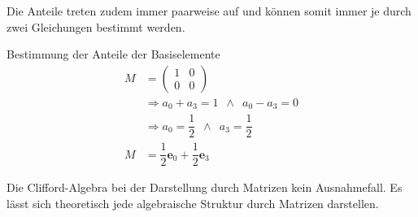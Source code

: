 Die Anteile treten zudem immer paarweise auf und können somit immer je durch zwei Gleichungen bestimmt werden.
\begin{beispiel}
	Bestimmung der Anteile der Basiselemente
	\begin{align}
		M &= 
		\begin{pmatrix}
			1 & 0 \\
			0 & 0
		\end{pmatrix}\\
		&\Rightarrow a_0 + a_3 = 1 \enspace\land\enspace a_0 - a_3 = 0\\
		&\Rightarrow a_0 = \dfrac{1}{2} \enspace\land\enspace a_3 = \dfrac{1}{2}\\
		M &= \dfrac{1}{2} \mathbf{e}_0+ \dfrac{1}{2} \mathbf{e}_3
	\end{align}
\end{beispiel}
Die Clifford-Algebra bei der Darstellung durch Matrizen kein Ausnahmefall. Es lässt sich theoretisch jede algebraische Struktur durch Matrizen darstellen.